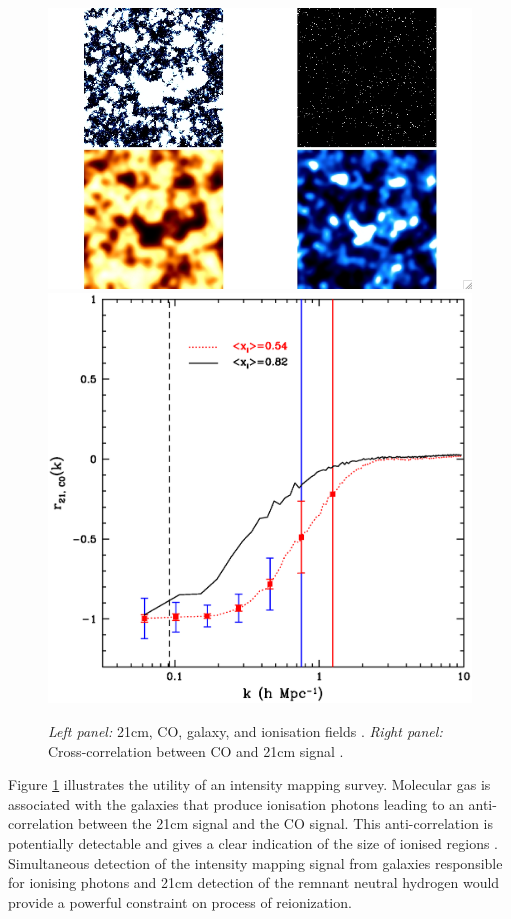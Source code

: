 \documentclass{PoS}
\begin{document}
\begin{figure}[htbp]
\begin{center}
\includegraphics[scale=0.35]{figures/21cm_co_ion_gal_b.jpg}
\includegraphics[scale=0.3]{figures/co_21cm_cross_col.eps}
\caption{{\em Left panel: } 21cm, CO, galaxy, and ionisation fields \cite{2012RPPh...75h6901P}. {\em Right panel: } Cross-correlation between CO and 21cm signal \cite{2011ApJ...741...70L}.}
\label{fig:cross_col}
\end{center}
\end{figure}
Figure \ref{fig:cross_col} illustrates the utility of an intensity mapping survey. Molecular gas is associated with the galaxies that produce ionisation photons leading to an anti-correlation between the 21cm signal and the CO signal. This anti-correlation is potentially detectable and gives a clear indication of the size of ionised regions \cite{2011ApJ...741...70L}. Simultaneous detection of the intensity mapping signal from galaxies responsible for ionising photons and 21cm detection of the remnant neutral hydrogen would provide a powerful constraint on process of reionization.
\end{document}
